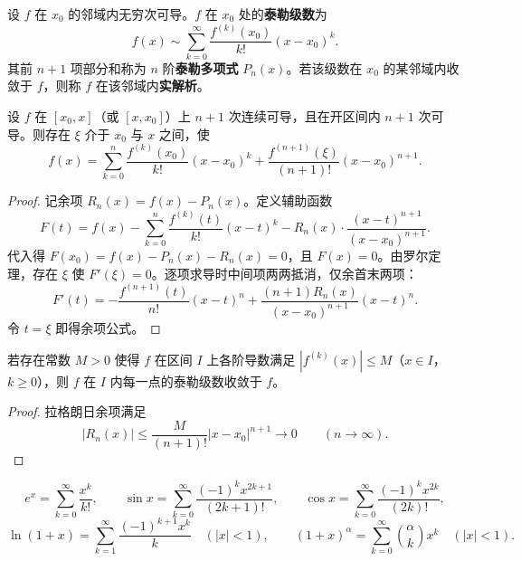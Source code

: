 \begin{definition}[泰勒级数]\label{def:taylor_series}
设 $f$ 在 $x_0$ 的邻域内无穷次可导。$f$ 在 $x_0$ 处的\textbf{泰勒级数}为
\[
f(x) \sim \sum_{k=0}^{\infty} \frac{f^{(k)}(x_0)}{k!}(x - x_0)^k.
\]
其前 $n+1$ 项部分和称为 $n$ 阶\textbf{泰勒多项式} $P_n(x)$。若该级数在 $x_0$ 的某邻域内收敛于 $f$，则称 $f$ 在该邻域内\textbf{实解析}。
\end{definition}

\begin{theorem}[带拉格朗日余项的泰勒公式]\label{thm:taylor_lagrange}
设 $f$ 在 $[x_0, x]$（或 $[x, x_0]$）上 $n+1$ 次连续可导，且在开区间内 $n+1$ 次可导。则存在 $\xi$ 介于 $x_0$ 与 $x$ 之间，使
\[
f(x) = \sum_{k=0}^{n} \frac{f^{(k)}(x_0)}{k!}(x-x_0)^k + \frac{f^{(n+1)}(\xi)}{(n+1)!}(x-x_0)^{n+1}.
\]
\end{theorem}

\begin{proof}
记余项 $R_n(x) = f(x) - P_n(x)$。定义辅助函数
\[
F(t) = f(x) - \sum_{k=0}^{n} \frac{f^{(k)}(t)}{k!}(x-t)^k - R_n(x)\cdot\frac{(x-t)^{n+1}}{(x-x_0)^{n+1}}.
\]
代入得 $F(x_0) = f(x) - P_n(x) - R_n(x) = 0$，且 $F(x) = 0$。由罗尔定理，存在 $\xi$ 使 $F'(\xi) = 0$。逐项求导时中间项两两抵消，仅余首末两项：
\[
F'(t) = -\frac{f^{(n+1)}(t)}{n!}(x-t)^n + \frac{(n+1) R_n(x)}{(x-x_0)^{n+1}}(x-t)^n.
\]
令 $t = \xi$ 即得余项公式。
\end{proof}

\begin{corollary}[泰勒级数收敛于函数的充分条件]\label{cor:taylor_analytic}
若存在常数 $M > 0$ 使得 $f$ 在区间 $I$ 上各阶导数满足 $|f^{(k)}(x)| \le M$（$x \in I$，$k \ge 0$），则 $f$ 在 $I$ 内每一点的泰勒级数收敛于 $f$。
\end{corollary}

\begin{proof}
拉格朗日余项满足
\[
|R_n(x)| \le \frac{M}{(n+1)!}|x - x_0|^{n+1} \to 0 \qquad (n \to \infty).
\]
\end{proof}

\begin{example}[基本初等函数的泰勒级数]\label{ex:taylor_examples}
\[
e^x = \sum_{k=0}^{\infty} \frac{x^k}{k!}, \qquad
\sin x = \sum_{k=0}^{\infty} \frac{(-1)^k x^{2k+1}}{(2k+1)!}, \qquad
\cos x = \sum_{k=0}^{\infty} \frac{(-1)^k x^{2k}}{(2k)!},
\]
\[
\ln(1+x) = \sum_{k=1}^{\infty} \frac{(-1)^{k+1} x^k}{k} \quad (|x| < 1), \qquad
(1+x)^{\alpha} = \sum_{k=0}^{\infty} \binom{\alpha}{k} x^k \quad (|x| < 1).
\]
\end{example}

